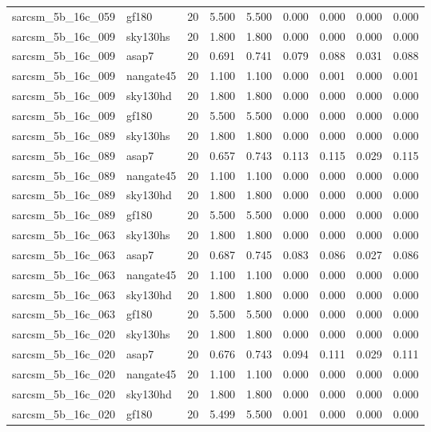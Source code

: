 \begin{tabular}{llrrrrrrr}
sarcsm\_5b\_16c\_059 & gf180 & 20 & 5.500 & 5.500 & 0.000 & 0.000 & 0.000 & 0.000 \\
sarcsm\_5b\_16c\_009 & sky130hs & 20 & 1.800 & 1.800 & 0.000 & 0.000 & 0.000 & 0.000 \\
sarcsm\_5b\_16c\_009 & asap7 & 20 & 0.691 & 0.741 & 0.079 & 0.088 & 0.031 & 0.088 \\
sarcsm\_5b\_16c\_009 & nangate45 & 20 & 1.100 & 1.100 & 0.000 & 0.001 & 0.000 & 0.001 \\
sarcsm\_5b\_16c\_009 & sky130hd & 20 & 1.800 & 1.800 & 0.000 & 0.000 & 0.000 & 0.000 \\
sarcsm\_5b\_16c\_009 & gf180 & 20 & 5.500 & 5.500 & 0.000 & 0.000 & 0.000 & 0.000 \\
sarcsm\_5b\_16c\_089 & sky130hs & 20 & 1.800 & 1.800 & 0.000 & 0.000 & 0.000 & 0.000 \\
sarcsm\_5b\_16c\_089 & asap7 & 20 & 0.657 & 0.743 & 0.113 & 0.115 & 0.029 & 0.115 \\
sarcsm\_5b\_16c\_089 & nangate45 & 20 & 1.100 & 1.100 & 0.000 & 0.000 & 0.000 & 0.000 \\
sarcsm\_5b\_16c\_089 & sky130hd & 20 & 1.800 & 1.800 & 0.000 & 0.000 & 0.000 & 0.000 \\
sarcsm\_5b\_16c\_089 & gf180 & 20 & 5.500 & 5.500 & 0.000 & 0.000 & 0.000 & 0.000 \\
sarcsm\_5b\_16c\_063 & sky130hs & 20 & 1.800 & 1.800 & 0.000 & 0.000 & 0.000 & 0.000 \\
sarcsm\_5b\_16c\_063 & asap7 & 20 & 0.687 & 0.745 & 0.083 & 0.086 & 0.027 & 0.086 \\
sarcsm\_5b\_16c\_063 & nangate45 & 20 & 1.100 & 1.100 & 0.000 & 0.000 & 0.000 & 0.000 \\
sarcsm\_5b\_16c\_063 & sky130hd & 20 & 1.800 & 1.800 & 0.000 & 0.000 & 0.000 & 0.000 \\
sarcsm\_5b\_16c\_063 & gf180 & 20 & 5.500 & 5.500 & 0.000 & 0.000 & 0.000 & 0.000 \\
sarcsm\_5b\_16c\_020 & sky130hs & 20 & 1.800 & 1.800 & 0.000 & 0.000 & 0.000 & 0.000 \\
sarcsm\_5b\_16c\_020 & asap7 & 20 & 0.676 & 0.743 & 0.094 & 0.111 & 0.029 & 0.111 \\
sarcsm\_5b\_16c\_020 & nangate45 & 20 & 1.100 & 1.100 & 0.000 & 0.000 & 0.000 & 0.000 \\
sarcsm\_5b\_16c\_020 & sky130hd & 20 & 1.800 & 1.800 & 0.000 & 0.000 & 0.000 & 0.000 \\
sarcsm\_5b\_16c\_020 & gf180 & 20 & 5.499 & 5.500 & 0.001 & 0.000 & 0.000 & 0.000 \\

\end{tabular}
